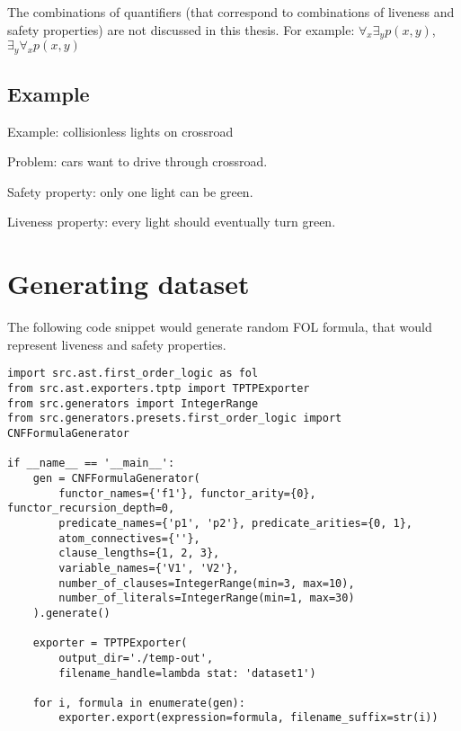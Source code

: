 The combinations of quantifiers (that correspond to combinations of liveness and safety properties) are not discussed in this thesis. For example: $\forall_x \exists_y p(x, y)$, $\exists_y \forall_x p(x, y)$

\subsection{Example}

Example: collisionless lights on crossroad

\noindent
Problem: cars want to drive through crossroad.

\noindent
Safety property: only one light can be green.

\noindent
Liveness property: every light should eventually turn green.

\section{Generating dataset}

The following code snippet would generate random \gls{FOL} formula, that would represent liveness and safety properties.

\begin{verbatim}
import src.ast.first_order_logic as fol
from src.ast.exporters.tptp import TPTPExporter
from src.generators import IntegerRange
from src.generators.presets.first_order_logic import CNFFormulaGenerator

if __name__ == '__main__':
    gen = CNFFormulaGenerator(
        functor_names={'f1'}, functor_arity={0}, functor_recursion_depth=0,
        predicate_names={'p1', 'p2'}, predicate_arities={0, 1},
        atom_connectives={''},
        clause_lengths={1, 2, 3},
        variable_names={'V1', 'V2'},
        number_of_clauses=IntegerRange(min=3, max=10),
        number_of_literals=IntegerRange(min=1, max=30)
    ).generate()

    exporter = TPTPExporter(
        output_dir='./temp-out',
        filename_handle=lambda stat: 'dataset1')

    for i, formula in enumerate(gen):
        exporter.export(expression=formula, filename_suffix=str(i))
\end{verbatim}

